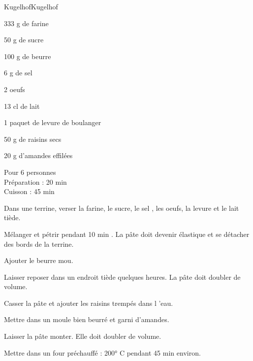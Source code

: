 \begin{recette}{Kugelhof}{Kugelhof}

\begin{ingredients}
333 g de farine\par
50 g de sucre\par
100 g de beurre\par
6 g de sel\par
2 oeufs\par
13 cl de lait\par
1 paquet de levure de boulanger\par
50 g  de raisins secs\par
20 g d’amandes effilées\par
\end{ingredients}

\begin{infos}
Pour 6 personnes\\
Préparation : 20 min\\
Cuisson : 45 min\\
\end{infos}

\begin{etapes}
\item Dans une terrine, verser la farine, le sucre, le sel , les oeufs, la levure et le lait tiède.
\item Mélanger et pétrir pendant 10 min . La pâte doit devenir élastique et se détacher des bords de la terrine.
\item Ajouter le beurre mou.
\item Laisser reposer dans un endroit tiède quelques heures. La pâte doit doubler de volume.
\item Casser la pâte et ajouter les raisins trempés dans l ’eau.
\item Mettre dans un moule bien beurré et garni d’amandes.
\item Laisser la pâte monter. Elle doit doubler de volume.
\item Mettre dans un four préchauffé : 200° C pendant 45 min environ.
\end{etapes}

\end{recette}